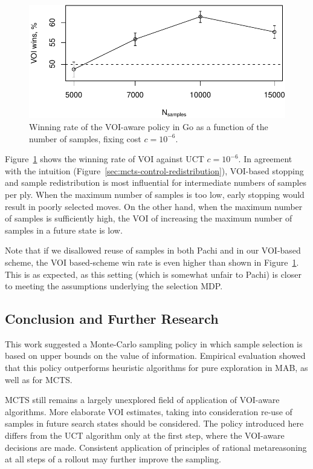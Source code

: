 \begin{figure}[h!]
\centering
\includegraphics[scale=0.55]{mcts-voi-wins.pdf}
\caption{Winning rate of the VOI-aware policy in Go as a function of the number of samples, fixing cost $c=10^{-6}$.}
\label{fig:voi-wins}
\end{figure}

Figure~\ref{fig:voi-wins}
shows the winning rate of VOI against UCT $c=10^{-6}$. In agreement with the intuition
(Figure~\ref{sec:mcts-control-redistribution}), VOI-based stopping and
sample redistribution is most influential for intermediate numbers of
samples per ply. When the maximum number of samples is too low, early
stopping would result in poorly selected moves. On the other hand,
when the maximum number of samples is sufficiently high, the VOI of
increasing the maximum number of samples in a future state is low.

Note that if we disallowed reuse of samples in both Pachi and
in our VOI-based scheme, the VOI based-scheme
win rate is even higher than shown in Figure~\ref{fig:voi-wins}. This is as expected,
as this setting (which is somewhat unfair to Pachi) is closer to
meeting the assumptions underlying the selection MDP.

\subsection{Conclusion and Further Research}

This work suggested a Monte-Carlo sampling policy in which sample
selection is based on upper bounds on the value of
information. Empirical evaluation showed that this policy outperforms
heuristic algorithms for pure exploration in MAB, as well as for MCTS.

MCTS still remains a largely unexplored field of
application of VOI-aware algorithms. More elaborate VOI estimates,
taking into consideration re-use of samples in future search states
should be considered. The policy introduced here differs from
the UCT algorithm only at the first step, where the VOI-aware
decisions are made. Consistent application of principles of rational
metareasoning at all steps of a rollout may further improve the
sampling.

